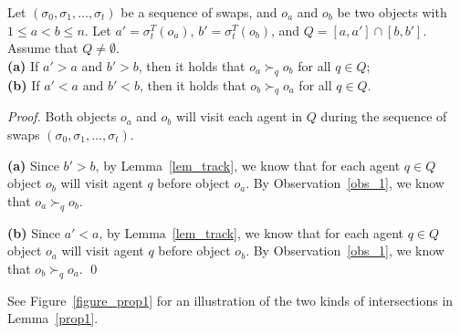 \begin{lemma}\label{prop1}
Let $(\sigma _0,\sigma _1,\dots,\sigma _t)$ be a sequence of swaps, and $o_a$ and $o_b$
be two objects with $1\leq a<b\leq n$. Let $a'=\sigma^T_t(o_a)$, $b'=\sigma^T_t(o_b)$, and $Q=[a,a']\cap [b,b']$. Assume that $Q\neq \emptyset$.\\
\textbf{(a)} If $a'>a$ and $b'>b$, then it holds that $o_a \succ_q o_b$ for all $q\in Q$;\\
\textbf{(b)} If $a'<a$ and $b'<b$, then it holds that $o_b \succ_q o_a$ for all $q\in Q$.
\end{lemma}
\begin{proof}
    Both objects  $o_a$ and $o_b$ will visit each agent in $Q$ during the sequence of swaps $(\sigma _0,\sigma _1,\dots,\sigma _t)$.

    \textbf{(a)} Since $b'>b$, by Lemma~\ref{lem_track}, we know that for each agent $q\in Q$ object $o_b$ will visit agent $q$ before object $o_a$.
    By Observation~\ref{obs_1}, we know that $o_a \succ_q o_b$.

    \textbf{(b)} Since $a'<a$, by Lemma~\ref{lem_track}, we know that for each agent $q\in Q$ object $o_a$ will visit agent $q$ before object $o_b$.
    By Observation~\ref{obs_1}, we know that $o_b \succ_q o_a$. \qed
\end{proof}

See Figure~\ref{figure_prop1} for an illustration of the two kinds of intersections in Lemma~\ref{prop1}.

